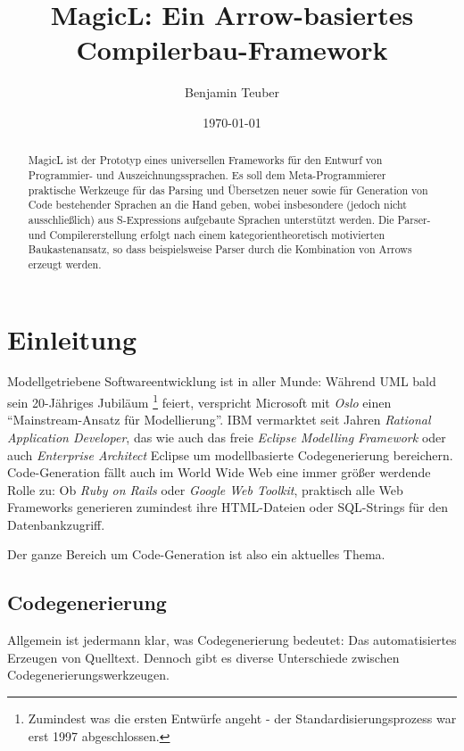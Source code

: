 \documentclass[a4paper, bibgerm]{article}
\begin{document}
\title{MagicL: Ein Arrow-basiertes Compilerbau-Framework}
\author{Benjamin Teuber}
\date{\today}


\begin{abstract}
  MagicL ist der Prototyp eines universellen Frameworks für den Entwurf
  von Programmier- und Auszeichnungssprachen. Es soll dem
  Meta-Programmierer praktische Werkzeuge für das Parsing und Übersetzen
  neuer sowie für Generation von Code bestehender Sprachen an die Hand
  geben, wobei insbesondere (jedoch nicht ausschließlich) aus
  S-Expressions aufgebaute Sprachen unterstützt werden. Die Parser- und
  Compilererstellung erfolgt nach einem kategorientheoretisch
  motivierten Baukastenansatz, so dass beispielsweise Parser durch die
  Kombination von Arrows erzeugt werden.
\end{abstract}


\section{Einleitung}
\label{sec:intro}

Modellgetriebene Softwareentwicklung ist in aller Munde: Während UML
bald sein 20-Jähriges Jubiläum \footnote{Zumindest was die ersten
  Entwürfe angeht - der Standardisierungsprozess war erst 1997
  abgeschlossen.} feiert, verspricht Microsoft mit \textit{Oslo}
\cite{TODO} einen ``Mainstream-Ansatz für Modellierung''. IBM vermarktet
seit Jahren \textit{Rational Application Developer}, das wie auch das
freie \textit{Eclipse Modelling Framework} oder auch \textit{Enterprise
  Architect} Eclipse um modellbasierte Codegenerierung bereichern.
Code-Generation fällt auch im World Wide Web eine immer größer werdende
Rolle zu: Ob \textit{Ruby on Rails} oder \textit{Google Web Toolkit},
praktisch alle Web Frameworks generieren zumindest ihre HTML-Dateien oder
SQL-Strings für den Datenbankzugriff.

Der ganze Bereich um Code-Generation ist also ein aktuelles Thema.

\subsection{Codegenerierung}
\label{sec:intro:codegen}

Allgemein ist jedermann klar, was Codegenerierung bedeutet:
Das automatisiertes Erzeugen von Quelltext. Dennoch gibt es diverse
Unterschiede zwischen Codegenerierungswerkzeugen.
\end{document}
